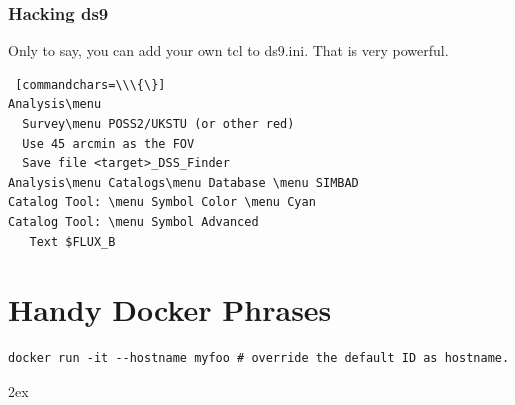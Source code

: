 \documentclass[letter,11pt,oneside]{article}
\newcommand{\menu}{\ensuremath{\;\rightarrow\;}}
\begin{document}
\subsubsection{Hacking ds9}

Only to say, you can add your own tcl to ds9.ini. That is very powerful.



\begingroup \fontsize{10pt}{10pt}
\selectfont
\begin{Verbatim} [commandchars=\\\{\}]
Analysis\menu
  Survey\menu POSS2/UKSTU (or other red) 
  Use 45 arcmin as the FOV
  Save file <target>_DSS_Finder
Analysis\menu Catalogs\menu Database \menu SIMBAD
Catalog Tool: \menu Symbol Color \menu Cyan
Catalog Tool: \menu Symbol Advanced
   Text $FLUX_B
\end{Verbatim}
\endgroup

\section{Handy Docker Phrases}

\begingroup \fontsize{10pt}{10pt}
\selectfont
\begin{verbatim} 
docker run -it --hostname myfoo # override the default ID as hostname.
\end{verbatim}
\endgroup






{}
\renewcommand*{\refname}{Bibliography and References}







\begingroup
\renewcommand{\notesname}{\textcolor{red} {Action Items/EndNotes:}}
\parindent 0pt
\parskip 2ex
{}
\def\enotesize{\normalsize}
\theendnotes
\endgroup

\clearpage
{}
\printindex %
\end{document}
